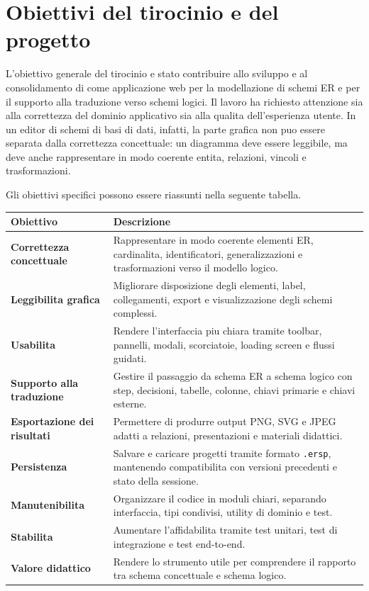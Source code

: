 \section{Obiettivi del tirocinio e del progetto}

L'obiettivo generale del tirocinio e stato contribuire allo sviluppo e al consolidamento di \builder{} come applicazione web per la modellazione di schemi ER e per il supporto alla traduzione verso schemi logici. Il lavoro ha richiesto attenzione sia alla correttezza del dominio applicativo sia alla qualita dell'esperienza utente. In un editor di schemi di basi di dati, infatti, la parte grafica non puo essere separata dalla correttezza concettuale: un diagramma deve essere leggibile, ma deve anche rappresentare in modo coerente entita, relazioni, vincoli e trasformazioni.

Gli obiettivi specifici possono essere riassunti nella seguente tabella.

\noindent\begin{tabularx}{\textwidth}{>{\bfseries}p{4cm}X}
Obiettivo & Descrizione \\
\hline
Correttezza concettuale & Rappresentare in modo coerente elementi ER, cardinalita, identificatori, generalizzazioni e trasformazioni verso il modello logico. \\
Leggibilita grafica & Migliorare disposizione degli elementi, label, collegamenti, export e visualizzazione degli schemi complessi. \\
Usabilita & Rendere l'interfaccia piu chiara tramite toolbar, pannelli, modali, scorciatoie, loading screen e flussi guidati. \\
Supporto alla traduzione & Gestire il passaggio da schema ER a schema logico con step, decisioni, tabelle, colonne, chiavi primarie e chiavi esterne. \\
Esportazione dei risultati & Permettere di produrre output PNG, SVG e JPEG adatti a relazioni, presentazioni e materiali didattici. \\
Persistenza & Salvare e caricare progetti tramite formato \texttt{.ersp}, mantenendo compatibilita con versioni precedenti e stato della sessione. \\
Manutenibilita & Organizzare il codice in moduli chiari, separando interfaccia, tipi condivisi, utility di dominio e test. \\
Stabilita & Aumentare l'affidabilita tramite test unitari, test di integrazione e test end-to-end. \\
Valore didattico & Rendere lo strumento utile per comprendere il rapporto tra schema concettuale e schema logico. \\
\end{tabularx}

